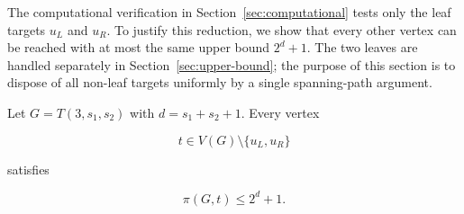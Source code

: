 

The computational verification in Section~\ref{sec:computational} tests only
the leaf targets $u_L$ and $u_R$. To justify this reduction, we show that every
other vertex can be reached with at most the same upper bound $2^d+1$.
The two leaves are handled separately in Section~\ref{sec:upper-bound}; the
purpose of this section is to dispose of all non-leaf targets uniformly by a
single spanning-path argument.


\begin{lemma}
\label{lem:offleaf}

Let $G=T(3,s_1,s_2)$ with $d=s_1+s_2+1$.
Every vertex

\[
t\in V(G)\setminus\{u_L,u_R\}
\]

satisfies

\[
\pi(G,t)\le 2^d+1 .
\]

\end{lemma}


